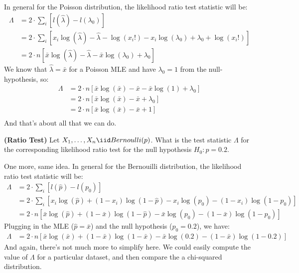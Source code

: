 In general for the Poisson distribution, the likelihood ratio test statistic
will be:
\begin{align*}
\Lambda &= 2 \cdot \sum_i \left[ l(\hat{\lambda}) - l(\lambda_0)  \right] \\
&= 2 \cdot \sum_i \left[ x_i \log(\hat{\lambda}) - \hat{\lambda} - \log(x_i!) - 
                         x_i \log(\lambda_0) + \lambda_0 + \log(x_i!)  \right] \\
&= 2 \cdot n \left[ \bar{x} \log(\hat{\lambda}) - \hat{\lambda} - \bar{x} \log(\lambda_0) + \lambda_0 \right] 
\end{align*}
We know that $\hat{\lambda} = \bar{x}$ for a Poisson MLE and have $\lambda_0 = 1$
from the null-hypothesis, so:
\begin{align*}
\Lambda
&= 2 \cdot n \left[ \bar{x} \log(\bar{x}) - \bar{x} - \bar{x} \log(1) + \lambda_0 \right] \\ 
&= 2 \cdot n \left[ \bar{x} \log(\bar{x}) - \bar{x} + \lambda_0 \right] \\ 
&= 2 \cdot n \left[ \bar{x} \log(\bar{x}) - \bar{x} + 1 \right] \\ 
\end{align*}
And that's about all that we can do. 


\textbf{(Ratio Test)} Let $X_1, \ldots, X_n \iid Bernoulli(p)$.
What is the test statistic $\Lambda$ for the corresponding likelihood 
ratio test for the null hypothesis $H_0: p = 0.2$.


One more, same idea. In general for the Bernouilli distribution, the likelihood
ratio test statistic will be:
\begin{align*}
\Lambda
&= 2 \cdot \sum_i \left[ l(\hat{p}) - l(p_0)  \right] \\
&= 2 \cdot \sum_i \left[ x_i \log(\hat{p}) + (1-x_i) \log(1 - \hat{p}) -
                         x_i \log(p_0) - (1-x_i) \log(1 - p_0) \right] \\
&= 2 \cdot n \left[ \bar{x} \log(\hat{p}) + (1-\bar{x}) \log(1 - \hat{p}) -
                    \bar{x} \log(p_0) - (1-\bar{x}) \log(1 - p_0) \right]                       
\end{align*}
Plugging in the MLE ($\hat{p} = \bar{x}$) and the null hypothesis ($p_0 = 0.2$),
we have:
\begin{align*}
\Lambda
&= 2 \cdot n \left[ \bar{x} \log(\bar{x}) + (1-\bar{x}) \log(1 - \bar{x}) -
                    \bar{x} \log(0.2) - (1-\bar{x}) \log(1 - 0.2) \right]                       
\end{align*}
And again, there's not much more to simplify here. We could easily compute
the value of $\Lambda$ for a particular dataset, and then compare the a 
chi-squared distribution.

